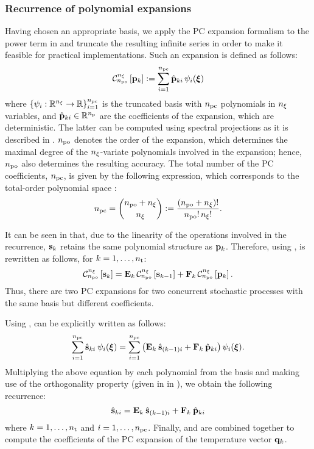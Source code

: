 \subsubsection{Recurrence of polynomial expansions} 
Having chosen an appropriate basis, we apply the PC expansion formalism to the power term in  and truncate the resulting infinite series in order to make it feasible for practical implementations.
Such an expansion is defined as follows:
\begin{equation} \elabel{pc-expansion}
  \oPC{\nvars}{\pcorder}{\vP_k} := \sum_{i = 1}^{\pcterms} \pcc{\vP}_{ki} \, \pcb_i(\vZ)
\end{equation}
where $\{ \psi_i: \mathbb{R}^{n_\xi} \to \mathbb{R} \}_{i = 1}^{{n_\text{pc}}}$ is the truncated basis with ${n_\text{pc}}$ polynomials in ${n_\xi}$ variables, and $\hat{\mathbf{p}}_{ki} \in \mathbb{R}^{n_\text{p}}$ are the coefficients of the expansion, which are deterministic.
The latter can be computed using spectral projections as it is described in .
${n_\text{po}}$ denotes the order of the expansion, which determines the maximal degree of the ${n_\xi}$-variate polynomials involved in the expansion; hence, ${n_\text{po}}$ also determines the resulting accuracy.
The total number of the PC coefficients, ${n_\text{pc}}$, is given by the following expression, which corresponds to the total-order polynomial space \cite{eldred2008, beck2011}:
\begin{equation} \elabel{pc-terms}
  \pcterms = { \pcorder + \nvars \choose \nvars } := \frac{(\pcorder + \nvars)!}{\pcorder! \, \nvars!}.
\end{equation}

It can be seen in  that, due to the linearity of the operations involved in the recurrence, $\mathbf{s}_k$ retains the same polynomial structure as $\mathbf{p}_k$.
Therefore, using ,  is rewritten as follows, for $k = 1, \dotsc, {n_\text{t}}$:
\begin{equation} \elabel{expanded-recurrence}
  \oPC{\nvars}{\pcorder}{\vS_k} = \mCF_k \, \oPC{\nvars}{\pcorder}{\vS_{k-1}} + \mCS_k \, \oPC{\nvars}{\pcorder}{\vP_k}.
\end{equation}
Thus, there are two PC expansions for two concurrent stochastic processes with the same basis but different coefficients.

Using ,  can be explicitly written as follows:
\[
  \sum_{i = 1}^{\pcterms} \pcc{\vS}_{ki} \: \pcb_i(\vZ) = \sum_{i = 1}^{\pcterms} \left( \mCF_k \: \pcc{\vS}_{(k - 1)i} + \mCS_k \: \pcc{\vP}_{ki} \right) \pcb_i(\vZ).
\]
Multiplying the above equation by each polynomial from the basis and making use of the orthogonality property (given in  in ), we obtain the following recurrence:
\begin{equation} \elabel{pc-recurrence}
  \pcc{\vS}_{ki} = \mCF_k \: \pcc{\vS}_{(k - 1)i} + \mCS_k \: \pcc{\vP}_{ki}
\end{equation}
where $k = 1, \dotsc, {n_\text{t}}$ and $i = 1, \dotsc, {n_\text{pc}}$. Finally,  and  are combined together to compute the coefficients of the PC expansion of the temperature vector $\mathbf{q}_k$.

